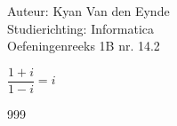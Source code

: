 \documentclass[a4paper]{article}
\begin{document}
  
\noindent \large Auteur: Kyan Van den Eynde \\
\noindent \large Studierichting: Informatica\\
\noindent \large Oefeningenreeks 1B nr. 14.2\\

\medskip

\normalsize

$\dfrac{1+i}{1-i} = i$\\

\begin{thebibliography}{999}
\end{thebibliography}
\end{document}
